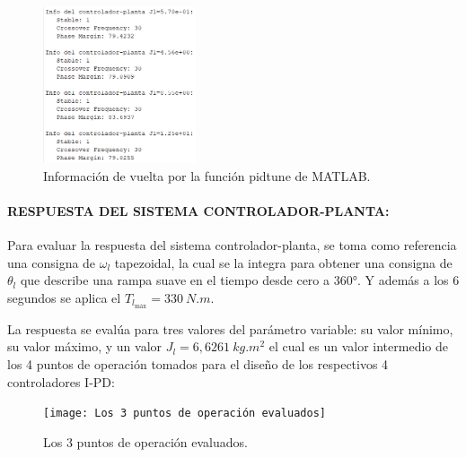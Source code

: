 \documentclass{article}
\begin{document}
\begin{sloppypar}
\begin{figure}[H]
    \centering
    \includegraphics[width=0.4\textwidth]{Información de vuelta por la función pidtune de MATLAB}
    \caption{Información de vuelta por la función pidtune de MATLAB.}
    \label{fig:Información de vuelta por la función pidtune de MATLAB}
\end{figure}


\paragraph{RESPUESTA DEL SISTEMA CONTROLADOR-PLANTA:}
\label{sec:RESPUESTA DEL SISTEMA CONTROLADOR-PLANTA:}
\hfill

\hfill

Para evaluar la respuesta del sistema controlador-planta, se toma como referencia una consigna de $\omega_l$ tapezoidal, la cual se la integra para obtener una consigna de $\theta_l$ que describe una rampa suave en el tiempo desde cero a 360°. Y además a los 6 segundos se aplica el $T_{l_{\text{máx}}}=330 ~N.m$.

La respuesta se evalúa para tres valores del parámetro variable: su valor mínimo, su valor máximo, y un valor $J_l=6,6261 ~kg.m^2$ el cual es un valor intermedio de los 4 puntos de operación tomados para el diseño de los respectivos 4 controladores I-PD:
\begin{figure}[H]
    \centering
    \texttt{[image: Los 3 puntos de operación evaluados]}
    \caption{Los 3 puntos de operación evaluados.}
    \label{fig:Los 3 puntos de operación evaluados}
\end{figure}


\end{sloppypar}
\end{document}
